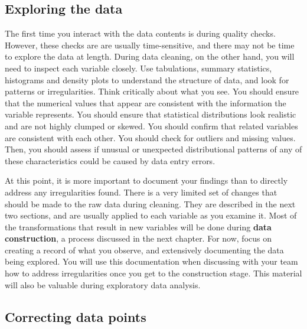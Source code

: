 \subsection{Exploring the data}

The first time you interact with the data contents is during quality checks.
However, these checks are are usually time-sensitive,
and there may not be time to explore the data at length.
During data cleaning, on the other hand,
you will need to inspect each variable closely.
Use tabulations, summary statistics, histograms and density plots to understand the structure of data,
and look for patterns or irregularities.
Think critically about what you see.
You should ensure that the numerical values that appear
are consistent with the information the variable represents.
You should ensure that statistical distributions look realistic
and are not highly clumped or skewed.
You should confirm that related variables are consistent with each other.
You should check for outliers and missing values.
Then, you should assess if unusual or unexpected distributional patterns
of any of these characteristics could be caused by data entry errors.

At this point, it is more important to document your findings
than to directly address any irregularities found.
There is a very limited set of changes that should be made to the raw data during cleaning.
They are described in the next two sections,
and are usually applied to each variable as you examine it.
Most of the transformations that result in new variables
will be done during \textbf{data construction}, 
a process discussed in the next chapter.
For now, focus on creating a record of what you observe,
and extensively documenting the data being explored.
You will use this documentation when discussing with your team
how to address irregularities once you get to the construction stage.
This material will also be valuable during exploratory data analysis.

\subsection{Correcting data points}

